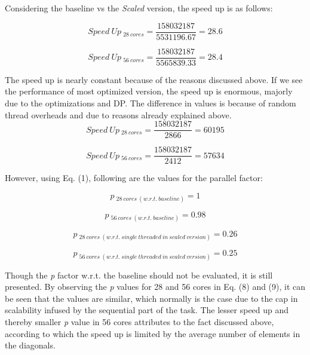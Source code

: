 \documentclass[a4paper,10pt,twoside]{article}
\begin{document}
Considering the baseline vs the \textit{Scaled} version, the speed up is as follows: 

\begin{equation}
Speed~Up~_{28~cores} = \frac{158032187}{5531196.67} = 28.6
\end{equation}

\begin{equation}
Speed~Up~_{56~cores} = \frac{158032187}{5565839.33} = 28.4
\end{equation}


The speed up is nearly constant because of the reasons discussed above.
If we see the performance of most optimized version, the speed up is enormous, majorly due to the optimizations and DP. The difference in values is because of random thread overheads and due to reasons already explained above.
\begin{equation}
Speed~Up~_{28~cores} = \frac{158032187}{2866} = 60195
\end{equation}

\begin{equation}
Speed~Up~_{56~cores} = \frac{158032187}{2412} = 57634
\end{equation}

However, using Eq. (1), following are the values for the parallel factor:

\begin{equation}
p~_{28~cores~(w.r.t.~baseline)} =  1
\end{equation}

\begin{equation}
p~_{56~cores~(w.r.t.~baseline)} =  0.98
\end{equation}

\begin{equation}
p~_{28~cores~(w.r.t.~single~threaded~in~scaled~version)} =  0.26
\end{equation}

\begin{equation}
p~_{56~cores~(w.r.t.~single~threaded~in~scaled~version)} =  0.25
\end{equation}


Though the \textit{p} factor w.r.t. the baseline should not be evaluated, it is still presented. By observing the \textit{p} values for 28 and 56 cores in Eq. (8) and (9), it can be seen that the values are similar, which normally is the case due to the cap in scalability infused by the sequential part of the task. The lesser speed up and thereby smaller \textit{p} value in 56 cores attributes to the fact discussed above, according to which the speed up is limited by the average number of elements in the diagonals.
\end{document}

